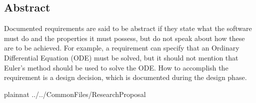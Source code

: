 \documentclass[12pt]{article}
\begin{document}
\subsection{Abstract}

Documented requirements are said to be abstract if they state what the software
must do and the properties it must possess, but do not speak about how these are
to be achieved. For example, a requirement can specify that an Ordinary
Differential Equation (ODE) must be solved, but it should not mention that
Euler's method should be used to solve the ODE. How to accomplish the
requirement is a design decision, which is documented during the design phase.

\newpage

 {plainnat}
 {../../CommonFiles/ResearchProposal}
\end{document}
